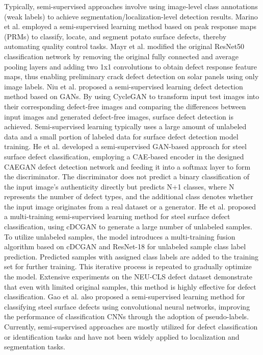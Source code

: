 \documentclass[conference]{IEEEtran}
\begin{document}
Typically, semi-supervised approaches involve using image-level class annotations (weak labels) to achieve segmentation/localization-level detection results. Marino et al. \cite{marino2019weakly} employed a semi-supervised learning method based on peak response maps (PRMs) \cite{zhou2018weakly} to classify, locate, and segment potato surface defects, thereby automating quality control tasks. Mayr et al. \cite{mayr2019weakly} modified the original ResNet50\cite{he2016deep} classification network by removing the original fully connected and average pooling layers and adding two 1x1 convolutions to obtain defect response feature maps, thus enabling preliminary crack defect detection on solar panels using only image labels. Niu et al. \cite{niu2019defectgan} proposed a semi-supervised learning defect detection method based on GANs. By using CycleGAN\cite{zhu2017unpaired} to transform input test images into their corresponding defect-free images and comparing the differences between input images and generated defect-free images, surface defect detection is achieved. Semi-supervised learning typically uses a large amount of unlabeled data and a small portion of labeled data for surface defect detection model training. He et al. \cite{di2019surface} developed a semi-supervised GAN-based approach \cite{odena2016semi} for steel surface defect classification, employing a CAE-based encoder in the designed CAEGAN defect detection network and feeding it into a softmax layer to form the discriminator. The discriminator does not predict a binary classification of the input image's authenticity directly but predicts N+1 classes, where N represents the number of defect types, and the additional class denotes whether the input image originates from a real dataset or a generator. He et al. \cite{he2019semi} proposed a multi-training semi-supervised learning method for steel surface defect classification, using cDCGAN\cite{mustapha2022conditional} to generate a large number of unlabeled samples. To utilize unlabeled samples, the model introduces a multi-training fusion algorithm based on cDCGAN and ResNet-18 for unlabeled sample class label prediction. Predicted samples with assigned class labels are added to the training set for further training. This iterative process is repeated to gradually optimize the model. Extensive experiments on the NEU-CLS defect dataset \cite{he2019end} demonstrate that even with limited original samples, this method is highly effective for defect classification. Gao et al. \cite{gao2020semi} also proposed a semi-supervised learning method for classifying steel surface defects using convolutional neural networks, improving the performance of classification CNNs through the adoption of pseudo-labels. Currently, semi-supervised approaches are mostly utilized for defect classification or identification tasks and have not been widely applied to localization and segmentation tasks.
\end{document}
